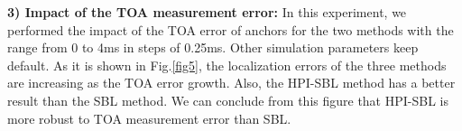 \textbf{3) Impact of the TOA measurement error:}
In this experiment, we performed the impact of the TOA error of anchors for the two methods with the range from 0 to 4ms in steps of 0.25ms. 
Other simulation parameters keep default. 
As it is shown in Fig.\ref{fig5}, the localization errors of the three methods are increasing as the TOA error growth. 
Also, the HPI-SBL method has a better result than the SBL method. We can conclude from this figure that HPI-SBL is more robust to TOA measurement error than SBL.

	



